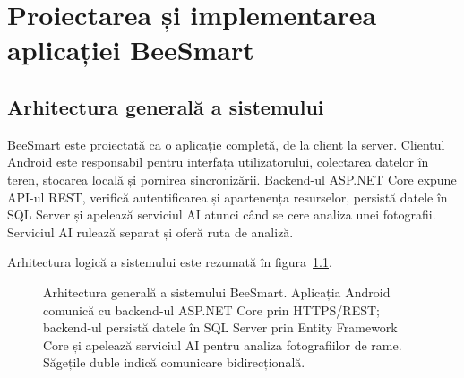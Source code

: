 \chapter{Proiectarea și implementarea aplicației BeeSmart}
\label{chap:implementare}

\section{Arhitectura generală a sistemului}

BeeSmart este proiectată ca o aplicație completă, de la client la server. Clientul Android este responsabil pentru interfața utilizatorului, colectarea datelor în teren, stocarea locală și pornirea sincronizării. Backend-ul ASP.NET Core expune API-ul REST, verifică autentificarea și apartenența resurselor, persistă datele în SQL Server și apelează serviciul AI atunci când se cere analiza unei fotografii. Serviciul AI rulează separat și oferă ruta de analiză.

Arhitectura logică a sistemului este rezumată în figura~\ref{fig:arhitectura-generala}.

\begin{figure}[H]
	\centering
	\caption{Arhitectura generală a sistemului BeeSmart. Aplicația Android comunică cu backend-ul ASP.NET Core prin HTTPS/REST; backend-ul persistă datele în SQL Server prin Entity Framework Core și apelează serviciul AI pentru analiza fotografiilor de rame. Săgețile duble indică comunicare bidirecțională.}
	\label{fig:arhitectura-generala}
\end{figure}

